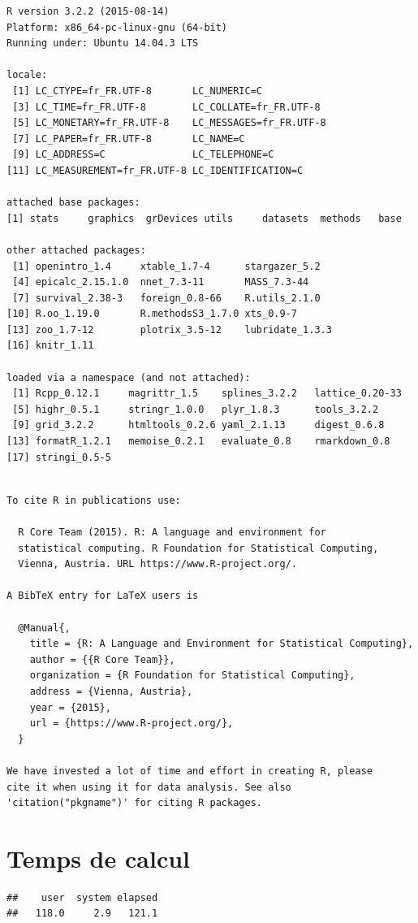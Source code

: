 \documentclass[]{article}
\begin{document}
\begin{verbatim}
R version 3.2.2 (2015-08-14)
Platform: x86_64-pc-linux-gnu (64-bit)
Running under: Ubuntu 14.04.3 LTS

locale:
 [1] LC_CTYPE=fr_FR.UTF-8       LC_NUMERIC=C              
 [3] LC_TIME=fr_FR.UTF-8        LC_COLLATE=fr_FR.UTF-8    
 [5] LC_MONETARY=fr_FR.UTF-8    LC_MESSAGES=fr_FR.UTF-8   
 [7] LC_PAPER=fr_FR.UTF-8       LC_NAME=C                 
 [9] LC_ADDRESS=C               LC_TELEPHONE=C            
[11] LC_MEASUREMENT=fr_FR.UTF-8 LC_IDENTIFICATION=C       

attached base packages:
[1] stats     graphics  grDevices utils     datasets  methods   base     

other attached packages:
 [1] openintro_1.4     xtable_1.7-4      stargazer_5.2    
 [4] epicalc_2.15.1.0  nnet_7.3-11       MASS_7.3-44      
 [7] survival_2.38-3   foreign_0.8-66    R.utils_2.1.0    
[10] R.oo_1.19.0       R.methodsS3_1.7.0 xts_0.9-7        
[13] zoo_1.7-12        plotrix_3.5-12    lubridate_1.3.3  
[16] knitr_1.11       

loaded via a namespace (and not attached):
 [1] Rcpp_0.12.1     magrittr_1.5    splines_3.2.2   lattice_0.20-33
 [5] highr_0.5.1     stringr_1.0.0   plyr_1.8.3      tools_3.2.2    
 [9] grid_3.2.2      htmltools_0.2.6 yaml_2.1.13     digest_0.6.8   
[13] formatR_1.2.1   memoise_0.2.1   evaluate_0.8    rmarkdown_0.8  
[17] stringi_0.5-5  
\end{verbatim}

\begin{verbatim}

To cite R in publications use:

  R Core Team (2015). R: A language and environment for
  statistical computing. R Foundation for Statistical Computing,
  Vienna, Austria. URL https://www.R-project.org/.

A BibTeX entry for LaTeX users is

  @Manual{,
    title = {R: A Language and Environment for Statistical Computing},
    author = {{R Core Team}},
    organization = {R Foundation for Statistical Computing},
    address = {Vienna, Austria},
    year = {2015},
    url = {https://www.R-project.org/},
  }

We have invested a lot of time and effort in creating R, please
cite it when using it for data analysis. See also
'citation("pkgname")' for citing R packages.
\end{verbatim}

\section{Temps de calcul}\label{temps-de-calcul}

\begin{verbatim}
##    user  system elapsed 
##   118.0     2.9   121.1
\end{verbatim}
\end{document}
